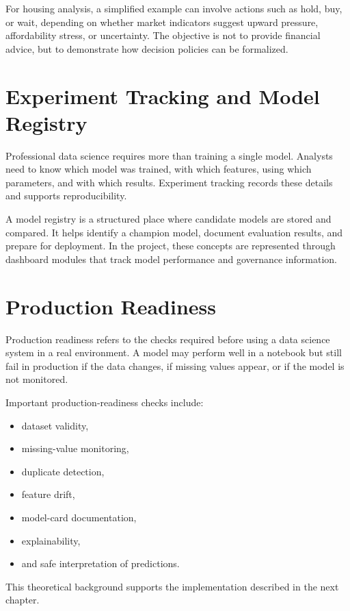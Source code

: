 For housing analysis, a simplified example can involve actions such as hold, buy, or wait, depending on whether market indicators suggest upward pressure, affordability stress, or uncertainty. The objective is not to provide financial advice, but to demonstrate how decision policies can be formalized.

\section{Experiment Tracking and Model Registry}

Professional data science requires more than training a single model. Analysts need to know which model was trained, with which features, using which parameters, and with which results. Experiment tracking records these details and supports reproducibility.

A model registry is a structured place where candidate models are stored and compared. It helps identify a champion model, document evaluation results, and prepare for deployment. In the project, these concepts are represented through dashboard modules that track model performance and governance information.

\section{Production Readiness}

Production readiness refers to the checks required before using a data science system in a real environment. A model may perform well in a notebook but still fail in production if the data changes, if missing values appear, or if the model is not monitored.

Important production-readiness checks include:
\begin{itemize}
\item dataset validity,
\item missing-value monitoring,
\item duplicate detection,
\item feature drift,
\item model-card documentation,
\item explainability,
\item and safe interpretation of predictions.
\end{itemize}

This theoretical background supports the implementation described in the next chapter.
